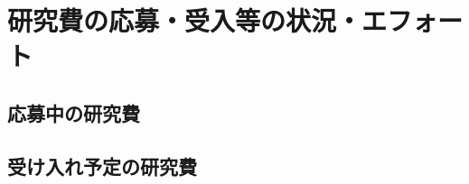 \documentclass[11pt,a4paper,twoside]{jarticle}
\newcommand{\研究種別}{C}	%
\newcommand{\研究課題名}{コ・クリエイティブなソフトウェア開発者を育成するPBL型教育}
\newcommand{\研究機関名}{産業技術大学院大学}
\newcommand{\研究代表者氏名}{中鉢　欣秀}
\newcommand{\研究代表者氏名ふりがな}{ちゅうばち　よしひで}
\newcommand{\本応募effort}{\KLEffort{18}}	%
\newcommand{\研究期間の最終元号年度}{27}	%
\begin{document}
\section{研究費の応募・受入等の状況・エフォート}
\subsection{応募中の研究費}
\newcommand{\本人の研究経費}{%
	\KLMyBudget{2015}{4905}%
}

\newcommand{\応募中の研究費}{%
		
}

\subsection{受け入れ予定の研究費}
\newcommand{\受け入れ予定の研究費}{%
}





\end{document}
